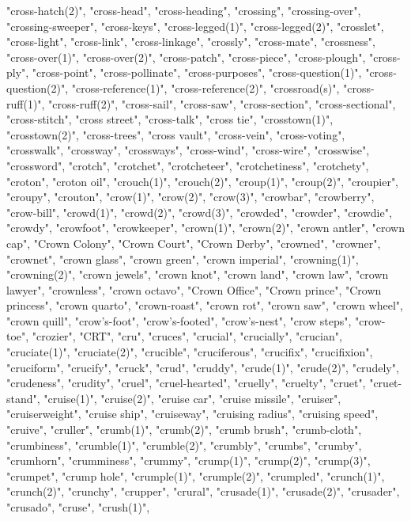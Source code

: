 "cross-hatch(2)",
"cross-head",
"cross-heading",
"crossing",
"crossing-over",
"crossing-sweeper",
"cross-keys",
"cross-legged(1)",
"cross-legged(2)",
"crosslet",
"cross-light",
"cross-link",
"cross-linkage",
"crossly",
"cross-mate",
"crossness",
"cross-over(1)",
"cross-over(2)",
"cross-patch",
"cross-piece",
"cross-plough",
"cross-ply",
"cross-point",
"cross-pollinate",
"cross-purposes",
"cross-question(1)",
"cross-question(2)",
"cross-reference(1)",
"cross-reference(2)",
"crossroad(s)",
"cross-ruff(1)",
"cross-ruff(2)",
"cross-sail",
"cross-saw",
"cross-section",
"cross-sectional",
"cross-stitch",
"cross street",
"cross-talk",
"cross tie",
"crosstown(1)",
"crosstown(2)",
"cross-trees",
"cross vault",
"cross-vein",
"cross-voting",
"crosswalk",
"crossway",
"crossways",
"cross-wind",
"cross-wire",
"crosswise",
"crossword",
"crotch",
"crotchet",
"crotcheteer",
"crotchetiness",
"crotchety",
"croton",
"croton oil",
"crouch(1)",
"crouch(2)",
"croup(1)",
"croup(2)",
"croupier",
"croupy",
"crouton",
"crow(1)",
"crow(2)",
"crow(3)",
"crowbar",
"crowberry",
"crow-bill",
"crowd(1)",
"crowd(2)",
"crowd(3)",
"crowded",
"crowder",
"crowdie",
"crowdy",
"crowfoot",
"crowkeeper",
"crown(1)",
"crown(2)",
"crown antler",
"crown cap",
"Crown Colony",
"Crown Court",
"Crown Derby",
"crowned",
"crowner",
"crownet",
"crown glass",
"crown green",
"crown imperial",
"crowning(1)",
"crowning(2)",
"crown jewels",
"crown knot",
"crown land",
"crown law",
"crown lawyer",
"crownless",
"crown octavo",
"Crown Office",
"Crown prince",
"Crown princess",
"crown quarto",
"crown-roast",
"crown rot",
"crown saw",
"crown wheel",
"crown quill",
"crow's-foot",
"crow's-footed",
"crow's-nest",
"crow steps",
"crow-toe",
"crozier",
"CRT",
"cru",
"cruces",
"crucial",
"crucially",
"crucian",
"cruciate(1)",
"cruciate(2)",
"crucible",
"cruciferous",
"crucifix",
"crucifixion",
"cruciform",
"crucify",
"cruck",
"crud",
"cruddy",
"crude(1)",
"crude(2)",
"crudely",
"crudeness",
"crudity",
"cruel",
"cruel-hearted",
"cruelly",
"cruelty",
"cruet",
"cruet-stand",
"cruise(1)",
"cruise(2)",
"cruise car",
"cruise missile",
"cruiser",
"cruiserweight",
"cruise ship",
"cruiseway",
"cruising radius",
"cruising speed",
"cruive",
"cruller",
"crumb(1)",
"crumb(2)",
"crumb brush",
"crumb-cloth",
"crumbiness",
"crumble(1)",
"crumble(2)",
"crumbly",
"crumbs",
"crumby",
"crumhorn",
"crumminess",
"crummy",
"crump(1)",
"crump(2)",
"crump(3)",
"crumpet",
"crump hole",
"crumple(1)",
"crumple(2)",
"crumpled",
"crunch(1)",
"crunch(2)",
"crunchy",
"crupper",
"crural",
"crusade(1)",
"crusade(2)",
"crusader",
"crusado",
"cruse",
"crush(1)",
